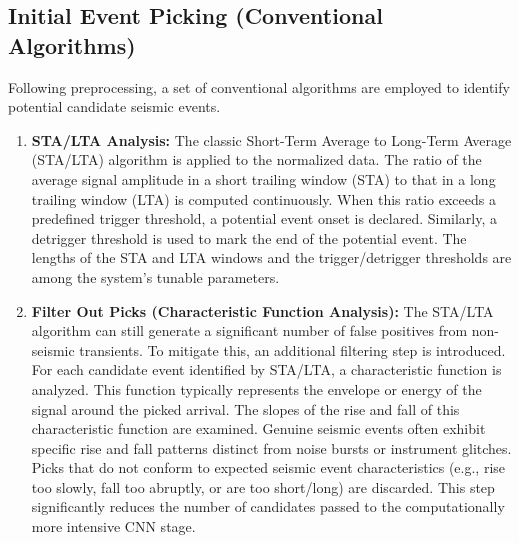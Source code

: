 \documentclass[conference]{IEEEtran}
\begin{document}
\subsection{Initial Event Picking (Conventional Algorithms)}
Following preprocessing, a set of conventional algorithms are employed to identify potential candidate seismic events.
\begin{enumerate}
    \item \textbf{STA/LTA Analysis:} The classic Short-Term Average to Long-Term Average (STA/LTA) algorithm \cite{b14} is applied to the normalized data. The ratio of the average signal amplitude in a short trailing window (STA) to that in a long trailing window (LTA) is computed continuously. When this ratio exceeds a predefined trigger threshold, a potential event onset is declared. Similarly, a detrigger threshold is used to mark the end of the potential event. The lengths of the STA and LTA windows and the trigger/detrigger thresholds are among the system's tunable parameters.
    \item \textbf{Filter Out Picks (Characteristic Function Analysis):} The STA/LTA algorithm can still generate a significant number of false positives from non-seismic transients. To mitigate this, an additional filtering step is introduced. For each candidate event identified by STA/LTA, a characteristic function is analyzed. This function typically represents the envelope or energy of the signal around the picked arrival. The slopes of the rise and fall of this characteristic function are examined. Genuine seismic events often exhibit specific rise and fall patterns distinct from noise bursts or instrument glitches. Picks that do not conform to expected seismic event characteristics (e.g., rise too slowly, fall too abruptly, or are too short/long) are discarded. This step significantly reduces the number of candidates passed to the computationally more intensive CNN stage.
\end{enumerate}
\end{document}
